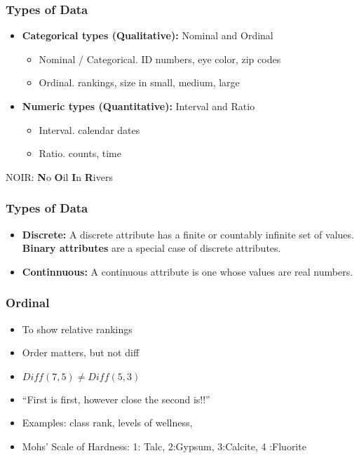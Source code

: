 \begin{frame}[fragile]\frametitle{Types of Data}	

	\begin{itemize}
	\item {\bf Categorical types (Qualitative):} Nominal and Ordinal
		\begin{itemize}
	\item Nominal / Categorical. ID numbers, eye color, zip codes
	\item Ordinal. rankings, size in {small, medium, large}
		\end{itemize}
	\item {\bf Numeric types (Quantitative):} Interval and Ratio
			\begin{itemize}
	\item Interval. calendar dates
	\item Ratio. counts, time
			\end{itemize}
	\end{itemize}
NOIR: {\bf N}o {\bf O}il {\bf I}n {\bf R}ivers
\end{frame}

\begin{frame}[fragile]\frametitle{Types of Data}	

\begin{itemize}
		\item {\bf Discrete:} A discrete attribute has a finite or countably infinite
		set of values. {\bf Binary attributes} are a special case of discrete attributes. 
		\item {\bf Continnuous:} A continuous attribute is one whose values are real numbers.
\end{itemize}
\end{frame}

\begin{frame}[fragile]\frametitle{Ordinal}	

	\begin{itemize}
	\item To show relative rankings 
	\item Order matters, but not diff
	\item $Diff(7,5) \neq Diff(5,3)$
	\item ``First is first, however close the second is!!''
	\item Examples: class rank, levels of wellness, 
\item Mohs' Scale of Hardness:	1: Talc,    2:Gypsum,     3:Calcite,      4 :Fluorite

	\end{itemize}

\end{frame}


